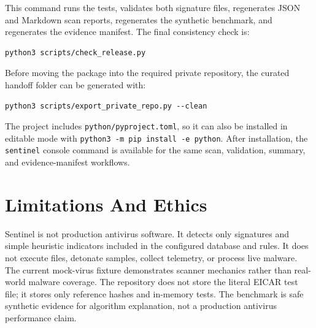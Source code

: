 \documentclass[11pt]{article}
\begin{document}
This command runs the tests, validates both signature files, regenerates JSON and
Markdown scan reports, regenerates the synthetic benchmark, and regenerates the
evidence manifest. The final consistency check is:

\begin{lstlisting}[style=sentinel]
python3 scripts/check_release.py
\end{lstlisting}

Before moving the package into the required private repository, the curated
handoff folder can be generated with:

\begin{lstlisting}[style=sentinel]
python3 scripts/export_private_repo.py --clean
\end{lstlisting}

The project includes \texttt{python/pyproject.toml}, so it can also be installed in
editable mode with \texttt{python3 -m pip install -e python}. After installation, the
\texttt{sentinel} console command is available for the same scan, validation,
summary, and evidence-manifest workflows.

\section{Limitations And Ethics}

Sentinel is not production antivirus software. It detects only signatures and
simple heuristic indicators included in the configured database and rules. It
does not execute files, detonate samples, collect telemetry, or process live
malware. The current mock-virus fixture demonstrates scanner mechanics rather
than real-world malware coverage. The repository does not store the literal
EICAR test file; it stores only reference hashes and in-memory tests. The
benchmark is safe synthetic evidence for algorithm explanation, not a production
antivirus performance claim.
\end{document}

